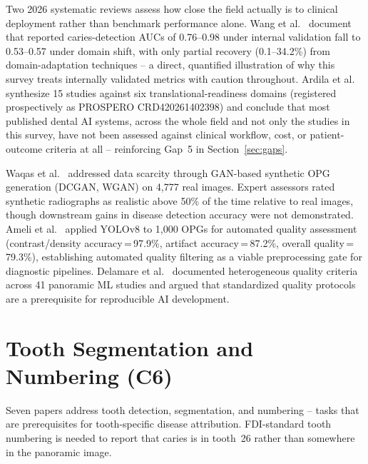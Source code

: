 \documentclass[conference]{IEEEtran}
\begin{document}
Two 2026 systematic reviews assess how close the field actually is to
clinical deployment rather than benchmark performance alone. Wang et
al.~\cite{wang2026artificial} document that reported caries-detection
AUCs of 0.76--0.98 under internal validation fall to 0.53--0.57 under
domain shift, with only partial recovery (0.1--34.2\%) from
domain-adaptation techniques -- a direct, quantified illustration of
why this survey treats internally validated metrics with caution
throughout. Ardila et al.~\cite{ardila2026algorithmic} synthesize 15
studies against six translational-readiness domains (registered
prospectively as PROSPERO CRD420261402398) and conclude that most
published dental AI systems, across the whole field and not only the
studies in this survey, have not been assessed against clinical
workflow, cost, or patient-outcome criteria at all -- reinforcing
Gap~5 in Section~\ref{sec:gaps}.

Waqas et al.~\cite{waqas2025synthetic} addressed data scarcity through
GAN-based synthetic OPG generation (DCGAN, WGAN) on 4,777 real images.
Expert assessors rated synthetic radiographs as realistic above 50\% of
the time relative to real images, though downstream gains in disease
detection accuracy were not demonstrated. Ameli et al.~\cite{ameli2025automated} applied YOLOv8 to 1,000 OPGs for
automated quality assessment (contrast/density accuracy\,=\,97.9\%,
artifact accuracy\,=\,87.2\%, overall quality\,=\,79.3\%),
establishing automated quality filtering as a viable preprocessing gate
for diagnostic pipelines. Delamare et al.~\cite{delamare2024panoramic}
documented heterogeneous quality criteria across 41 panoramic ML
studies and argued that standardized quality protocols are a prerequisite for
reproducible AI development.

\section{Tooth Segmentation and Numbering (C6)}
\label{sec:segmentation}

Seven papers address tooth detection, segmentation, and numbering --
tasks that are prerequisites for tooth-specific disease attribution.
FDI-standard tooth numbering is needed to report that caries is in
tooth~26 rather than somewhere in the panoramic image.
\end{document}
